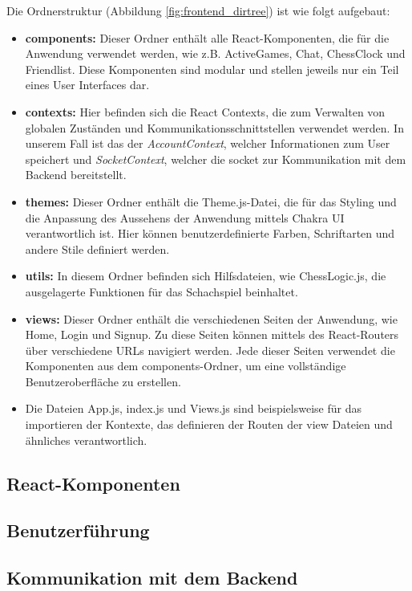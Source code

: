 \documentclass[a4paper,12pt]{report}
\begin{document}
Die Ordnerstruktur (Abbildung \ref{fig:frontend_dirtree}) ist wie folgt aufgebaut:
\begin{itemize}
\item \textbf{components:} Dieser Ordner enthält alle React-Komponenten, die für die Anwendung verwendet werden, wie z.B. ActiveGames, Chat, ChessClock und Friendlist. Diese Komponenten sind modular und stellen jeweils nur ein Teil eines User Interfaces dar.
\item \textbf{contexts:} Hier befinden sich die React Contexts, die zum Verwalten von globalen Zuständen und Kommunikationsschnittstellen verwendet werden. In unserem Fall ist das der \textit{AccountContext}, welcher Informationen zum User speichert und \textit{SocketContext}, welcher die socket zur Kommunikation mit dem Backend bereitstellt.
\item \textbf{themes:} Dieser Ordner enthält die Theme.js-Datei, die für das Styling und die Anpassung des Aussehens der Anwendung mittels Chakra UI verantwortlich ist. Hier können benutzerdefinierte Farben, Schriftarten und andere Stile definiert werden.
\item \textbf{utils:} In diesem Ordner befinden sich Hilfsdateien, wie ChessLogic.js, die ausgelagerte Funktionen für das Schachspiel beinhaltet.
\item \textbf{views:} Dieser Ordner enthält die verschiedenen Seiten der Anwendung, wie Home, Login und Signup. Zu diese Seiten können mittels des React-Routers über verschiedene URLs navigiert werden. Jede dieser Seiten verwendet die Komponenten aus dem components-Ordner, um eine vollständige Benutzeroberfläche zu erstellen.
\item Die Dateien App.js, index.js und Views.js sind beispielsweise für das importieren der Kontexte, das definieren der Routen der view Dateien und ähnliches verantwortlich.
\end{itemize}
    
        \subsection{React-Komponenten}
    
        \subsection{Benutzerführung}
        \subsection{Kommunikation mit dem Backend}
\end{document}
